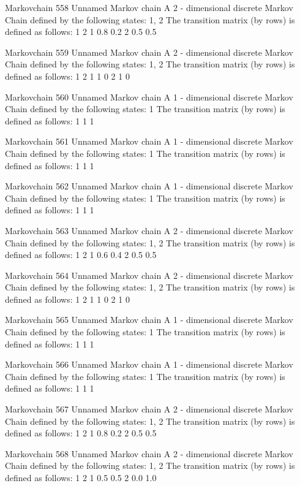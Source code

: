 \documentclass[
  nojss]{jss}
\begin{document}
\begin{CodeChunk}
\begin{CodeOutput}
Markovchain  558 
Unnamed Markov chain 
 A  2 - dimensional discrete Markov Chain defined by the following states: 
 1, 2 
 The transition matrix  (by rows)  is defined as follows: 
    1   2
1 0.8 0.2
2 0.5 0.5

Markovchain  559 
Unnamed Markov chain 
 A  2 - dimensional discrete Markov Chain defined by the following states: 
 1, 2 
 The transition matrix  (by rows)  is defined as follows: 
  1 2
1 1 0
2 1 0

Markovchain  560 
Unnamed Markov chain 
 A  1 - dimensional discrete Markov Chain defined by the following states: 
 1 
 The transition matrix  (by rows)  is defined as follows: 
  1
1 1

Markovchain  561 
Unnamed Markov chain 
 A  1 - dimensional discrete Markov Chain defined by the following states: 
 1 
 The transition matrix  (by rows)  is defined as follows: 
  1
1 1

Markovchain  562 
Unnamed Markov chain 
 A  1 - dimensional discrete Markov Chain defined by the following states: 
 1 
 The transition matrix  (by rows)  is defined as follows: 
  1
1 1

Markovchain  563 
Unnamed Markov chain 
 A  2 - dimensional discrete Markov Chain defined by the following states: 
 1, 2 
 The transition matrix  (by rows)  is defined as follows: 
    1   2
1 0.6 0.4
2 0.5 0.5

Markovchain  564 
Unnamed Markov chain 
 A  2 - dimensional discrete Markov Chain defined by the following states: 
 1, 2 
 The transition matrix  (by rows)  is defined as follows: 
  1 2
1 1 0
2 1 0

Markovchain  565 
Unnamed Markov chain 
 A  1 - dimensional discrete Markov Chain defined by the following states: 
 1 
 The transition matrix  (by rows)  is defined as follows: 
  1
1 1

Markovchain  566 
Unnamed Markov chain 
 A  1 - dimensional discrete Markov Chain defined by the following states: 
 1 
 The transition matrix  (by rows)  is defined as follows: 
  1
1 1

Markovchain  567 
Unnamed Markov chain 
 A  2 - dimensional discrete Markov Chain defined by the following states: 
 1, 2 
 The transition matrix  (by rows)  is defined as follows: 
    1   2
1 0.8 0.2
2 0.5 0.5

Markovchain  568 
Unnamed Markov chain 
 A  2 - dimensional discrete Markov Chain defined by the following states: 
 1, 2 
 The transition matrix  (by rows)  is defined as follows: 
    1   2
1 0.5 0.5
2 0.0 1.0


\end{CodeOutput}
\end{CodeChunk}
\end{document}
